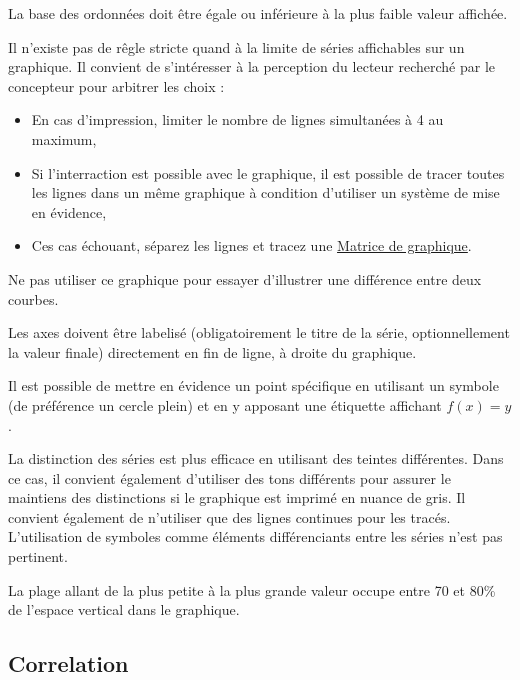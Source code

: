 \documentclass[a4paper,12pt]{article}
\begin{document}
\begin{multicols}{2}
La base des ordonnées doit être égale ou inférieure à la plus faible valeur affichée. \autocite{wongWallStreetJournal2010}

Il n'existe pas de rêgle stricte quand à la limite de séries affichables sur un graphique.\autocite{jonathanschwabishTime2021} Il convient de s'intéresser à la perception du lecteur recherché par le concepteur pour arbitrer les choix : \autocite{jonathanschwabishTime2021}
\begin{itemize}
\item En cas d'impression, limiter le nombre de lignes simultanées à 4 au maximum, \autocite{wongWallStreetJournal2010}
\item Si l'interraction est possible avec le graphique, il est possible de tracer toutes les lignes dans un même graphique à condition d'utiliser un système de mise en évidence,\autocite{jonathanschwabishTime2021}
\item Ces cas échouant, séparez les lignes et tracez une \hyperref[sec:org642ccd6]{Matrice de graphique}.
\end{itemize}

Ne pas utiliser ce graphique pour essayer d'illustrer une différence entre deux courbes. \autocite{jonathanschwabishTime2021}

Les axes doivent être labelisé (obligatoirement le titre de la série, optionnellement la valeur finale) directement en fin de ligne, à droite du graphique. \autocite{andreaskrauseBestPracticesData2024,sosulskiGraphics2019}

Il est possible de mettre en évidence un point spécifique en utilisant un symbole (de préférence un cercle plein) et en y apposant une étiquette affichant \(f(x)=y\).

La distinction des séries est plus efficace en utilisant des teintes différentes. Dans ce cas, il convient également d'utiliser des tons différents pour assurer le maintiens des distinctions si le graphique est imprimé en nuance de gris. \autocite{stephenfewComponentlevelGraphDesign2012}
Il convient également de n'utiliser que des lignes continues pour les tracés. \autocite{stephenfewComponentlevelGraphDesign2012}
L'utilisation de symboles comme éléments différenciants entre les séries n'est pas pertinent. \autocite{stephenfewComponentlevelGraphDesign2012}

La plage allant de la plus petite à la plus grande valeur occupe entre 70 et 80\% de l'espace vertical dans le graphique.\autocite{mikecisnerosWhatLineGraph2024}
\subsection*{Correlation}
\label{sec:org750c147}


\end{multicols}
\end{document}
